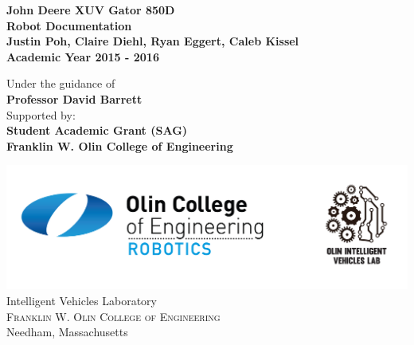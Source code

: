 \begin{titlepage}

\begin{center}

\vfill

\LARGE \textbf {John Deere XUV Gator 850D}\\
\LARGE \textbf {Robot Documentation}\\[0.5in]

\small \textbf{Justin Poh, Claire Diehl, Ryan Eggert, Caleb Kissel} \\
\small \textbf{Academic Year 2015 - 2016}

\vspace{.1in}
Under the guidance of\\
{\textbf{Professor David Barrett}}\\[0.2in]

\vspace{.1in}
Supported by:\\
{\textbf{Student Academic Grant (SAG) \\ Franklin W. Olin College of Engineering}}\\[0.2in]

\vfill

\includegraphics[scale=0.17]{Logos.jpg}
\Large{Intelligent Vehicles Laboratory}\\
\normalsize
\textsc{Franklin W. Olin College of Engineering}\\
Needham, Massachusetts \\


\end{center}

\end{titlepage}
